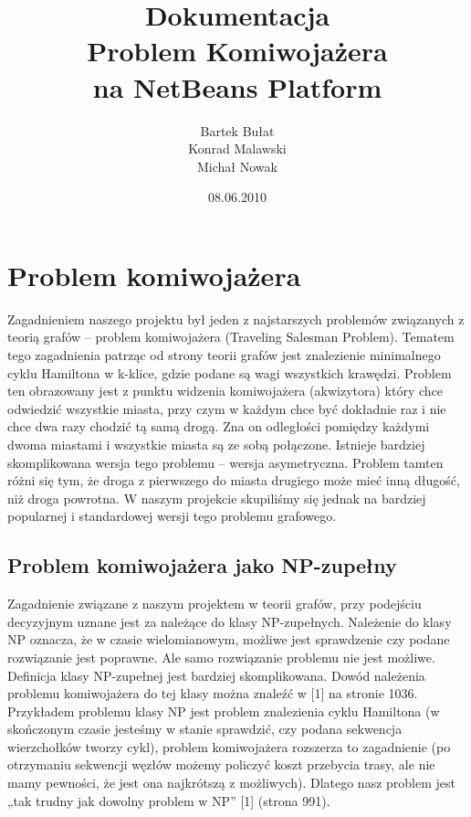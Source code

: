 \documentclass[a4paper]{article}
\title{Dokumentacja \\ Problem Komiwojażera \\ na NetBeans Platform}
\author{Bartek Bułat \\ Konrad Malawski \\ Michał Nowak}
\date{08.06.2010}
\begin{document}
\maketitle
\newpage

\tableofcontents
\newpage

\section{Problem komiwojażera}
Zagadnieniem naszego projektu był jeden z najstarszych problemów związanych z teorią grafów – problem komiwojażera (Traveling Salesman Problem). Tematem tego zagadnienia patrząc od strony teorii grafów jest znalezienie minimalnego cyklu Hamiltona w k-klice, gdzie podane są wagi wszystkich krawędzi. Problem ten obrazowany jest z punktu widzenia komiwojażera (akwizytora) który chce odwiedzić wszystkie miasta, przy czym w każdym chce być dokładnie raz i nie chce dwa razy chodzić tą samą drogą. Zna on odległości pomiędzy każdymi dwoma miastami i wszystkie miasta są ze sobą połączone. Istnieje bardziej skomplikowana wersja tego problemu – wersja asymetryczna. Problem tamten różni się tym, że droga z pierwszego do miasta drugiego może mieć inną długość, niż droga powrotna. W naszym projekcie skupiliśmy się jednak na bardziej popularnej i standardowej wersji tego problemu grafowego.

\subsection{Problem komiwojażera jako NP-zupełny}
Zagadnienie związane z naszym projektem w teorii grafów, przy podejściu decyzyjnym uznane jest za należące do klasy NP-zupełnych. Należenie do klasy NP oznacza, że w czasie wielomianowym, możliwe jest sprawdzenie czy podane rozwiązanie jest poprawne. Ale samo rozwiązanie problemu nie jest możliwe. Definicja klasy NP-zupełnej jest bardziej skomplikowana. Dowód należenia problemu komiwojażera do tej klasy można znaleźć w [1] na stronie 1036. Przykładem problemu klasy NP jest problem znalezienia cyklu Hamiltona (w skończonym czasie jesteśmy w stanie sprawdzić, czy podana sekwencja wierzchołków tworzy cykl), problem komiwojażera rozszerza to zagadnienie (po otrzymaniu sekwencji węzłów możemy policzyć koszt przebycia trasy, ale nie mamy pewności, że jest ona najkrótszą z możliwych). Dlatego nasz problem jest „tak trudny jak dowolny problem w NP” [1] (strona 991).
\end{document}
